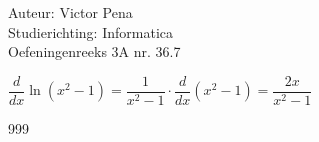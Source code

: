 \documentclass[a4paper]{article}
\begin{document}
	
	\noindent \large Auteur: Victor Pena \\
	\noindent \large Studierichting: Informatica\\
	\noindent \large Oefeningenreeks 3A nr. 36.7\\
	
	\medskip
	
	\normalsize 
	$\dfrac{d}{dx}\ln \left(x^2-1\right) = \dfrac{1}{x^2-1}\cdot\dfrac{d}{dx}\left(x^2-1\right) = \dfrac{2x}{x^2-1}$
	
	
	\begin{thebibliography}{999}
	\end{thebibliography}
\end{document}
